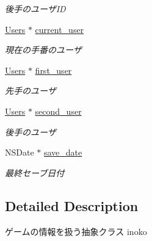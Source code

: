 \begin{DoxyCompactItemize}
\begin{DoxyCompactList}\small\item\em 後手のユーザID \end{DoxyCompactList}\item 
\hypertarget{interface_games_a40778a2f58868099a3f97eadbd5453fa}{
\hyperlink{interface_users}{Users} $\ast$ \hyperlink{interface_games_a40778a2f58868099a3f97eadbd5453fa}{current\_\-user}}
\label{interface_games_a40778a2f58868099a3f97eadbd5453fa}

\begin{DoxyCompactList}\small\item\em 現在の手番のユーザ \end{DoxyCompactList}\item 
\hypertarget{interface_games_a0765b81292303fec128e619fab915d7b}{
\hyperlink{interface_users}{Users} $\ast$ \hyperlink{interface_games_a0765b81292303fec128e619fab915d7b}{first\_\-user}}
\label{interface_games_a0765b81292303fec128e619fab915d7b}

\begin{DoxyCompactList}\small\item\em 先手のユーザ \end{DoxyCompactList}\item 
\hypertarget{interface_games_ac220cf3094d5f19ca52def5f66e0b2b9}{
\hyperlink{interface_users}{Users} $\ast$ \hyperlink{interface_games_ac220cf3094d5f19ca52def5f66e0b2b9}{second\_\-user}}
\label{interface_games_ac220cf3094d5f19ca52def5f66e0b2b9}

\begin{DoxyCompactList}\small\item\em 後手のユーザ \end{DoxyCompactList}\item 
\hypertarget{interface_games_a6ed89c5b910e9913e4f28462e32691f1}{
NSDate $\ast$ \hyperlink{interface_games_a6ed89c5b910e9913e4f28462e32691f1}{save\_\-date}}
\label{interface_games_a6ed89c5b910e9913e4f28462e32691f1}

\begin{DoxyCompactList}\small\item\em 最終セーブ日付 \end{DoxyCompactList}\end{DoxyCompactItemize}


\subsection{Detailed Description}
ゲームの情報を扱う抽象クラス  inoko 

